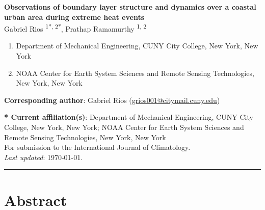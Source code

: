 \documentclass[11pt,a4paper]{article}
\begin{document}

\textbf{Observations of boundary layer structure and dynamics over a coastal urban area during extreme heat events} \\
Gabriel Rios \textsuperscript{1*, 2*}, Prathap Ramamurthy \textsuperscript{1, 2}

\small{
\begin{enumerate}[leftmargin=0.5cm, itemsep=0mm]
	\item Department of Mechanical Engineering, CUNY City College, New York, New York
	\item NOAA Center for Earth System Sciences and Remote Sensing Technologies, New York, New York
\end{enumerate}
}

\textbf{Corresponding author}: Gabriel Rios (\href{mailto:grios001@citymail.cuny.edu}{grios001@citymail.cuny.edu})

\textbf{* Current affiliation(s)}: Department of Mechanical Engineering, CUNY City College, New York, New York; NOAA Center for Earth System Sciences and Remote Sensing Technologies, New York, New York \\

\small{For submission to the International Journal of Climatology.} \\
\small{\textit{Last updated}: \today.}

\noindent\rule{\textwidth}{1pt}

\linenumbers


\section*{Abstract}
\end{document}
